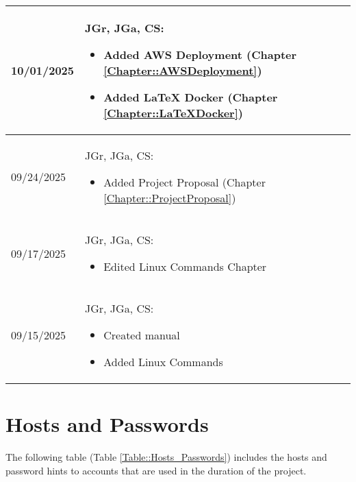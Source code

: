 \begin{longtable}{|l||p{12.5cm}|}
10/01/2025 & JGr, JGa, CS:
\begin{itemize}[topsep=0pt,itemsep=0pt,parsep=0pt,partopsep=0pt,leftmargin=12pt]
\item Added AWS Deployment (Chapter \ref{Chapter::AWSDeployment})
\item Added LaTeX Docker (Chapter \ref{Chapter::LaTeXDocker})
\end{itemize} 
\\ \hline

09/24/2025 & JGr, JGa, CS:
\begin{itemize}[topsep=0pt,itemsep=0pt,parsep=0pt,partopsep=0pt,leftmargin=12pt]
\item Added Project Proposal (Chapter \ref{Chapter::ProjectProposal})
\end{itemize} 
\\ \hline

09/17/2025 & JGr, JGa, CS:
\begin{itemize}[topsep=0pt,itemsep=0pt,parsep=0pt,partopsep=0pt,leftmargin=12pt]
\item Edited Linux Commands Chapter
\end{itemize} 
\\ \hline

09/15/2025 & JGr, JGa, CS:
\begin{itemize}[topsep=0pt,itemsep=0pt,parsep=0pt,partopsep=0pt,leftmargin=12pt]
\item Created manual
\item Added Linux Commands
\end{itemize} 
\\ \hline

\end{longtable}

\section{Hosts and Passwords}

The following table (Table \ref{Table::Hosts_Passwords}) includes the hosts and password hints to accounts that are used in the duration of the project.

